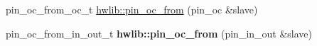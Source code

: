\textbf{ }\par
\begin{DoxyCompactItemize}
\item 
pin\+\_\+oc\+\_\+from\+\_\+oc\+\_\+t \hyperlink{namespacehwlib_aa2c63efcb24f3d5124567356d8c8a804}{hwlib\+::pin\+\_\+oc\+\_\+from} (pin\+\_\+oc \&slave)
\item 
\mbox{\label{namespacehwlib_aadf46e836cefb756596267ec58d268f7}} 
pin\+\_\+oc\+\_\+from\+\_\+in\+\_\+out\+\_\+t {\bfseries hwlib\+::pin\+\_\+oc\+\_\+from} (pin\+\_\+in\+\_\+out \&slave)
\end{DoxyCompactItemize}

